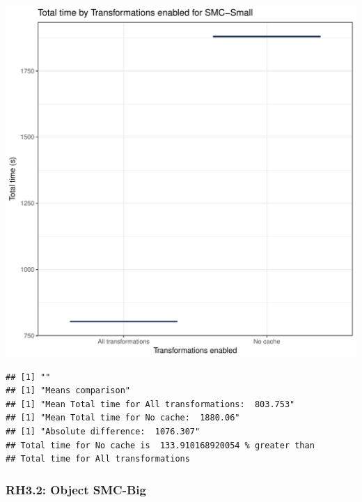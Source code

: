 \documentclass{article}\usepackage[]{graphicx}\usepackage[]{color}
\makeatletter
\def\maxwidth{ %
  \ifdim\Gin@nat@width>\linewidth
    \linewidth
  \else
    \Gin@nat@width
  \fi
}
\newenvironment{kframe}{%
 \def\at@end@of@kframe{}%
 \ifinner\ifhmode%
  \def\at@end@of@kframe{\end{minipage}}%
  \begin{minipage}{\columnwidth}%
 \fi\fi%
 \def\FrameCommand##1{\hskip\@totalleftmargin \hskip-\fboxsep
 \colorbox{shadecolor}{##1}\hskip-\fboxsep
     \hskip-\linewidth \hskip-\@totalleftmargin \hskip\columnwidth}%
 \MakeFramed {\advance\hsize-\width
   \@totalleftmargin\z@ \linewidth\hsize
   \@setminipage}}%
 {\par\unskip\endMakeFramed%
 \at@end@of@kframe}
\newenvironment{knitrout}{}{} %
\makeatother
\begin{document}
\begin{knitrout}
\color{fgcolor}
\includegraphics[width=\maxwidth]{figure/RH3_small-1} 
\begin{kframe}

{\ttfamily\noindent\bfseries\color{errorcolor}{\#\# Error in eval(expr, envir, enclos): object 'shap\_cashew\_small' not found}}\begin{verbatim}
## [1] ""
## [1] "Means comparison"
## [1] "Mean Total time for All transformations:  803.753"
## [1] "Mean Total time for No cache:  1880.06"
## [1] "Absolute difference:  1076.307"
## Total time for No cache is  133.910168920054 % greater than 
## Total time for All transformations
\end{verbatim}
\end{kframe}
\end{knitrout}


\subsubsection{RH3.2: Object SMC-Big}
\end{document}
